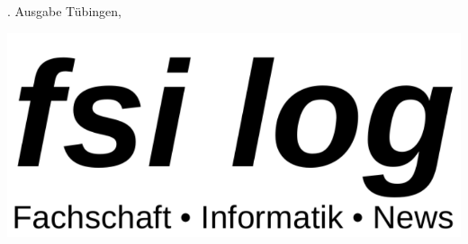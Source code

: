 \thispagestyle{empty}
{\sf \number\auflage. Ausgabe \hfill Tübingen, \Month\space \number\jahr}\\
\vspace{5cm}

\includegraphics[width=\textwidth]{logos/fsi-log-logo}


\begin{center}
%
%
%
%
\vfill
\end{center}
\eject